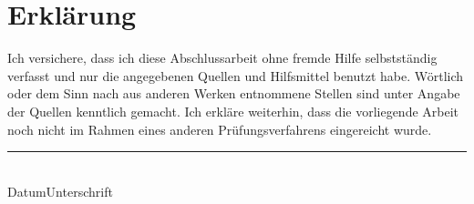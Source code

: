 \chapter*{Erklärung}
Ich  versichere, dass  ich diese  Abschlussarbeit ohne  fremde  Hilfe selbstständig
verfasst und  nur die  angegebenen Quellen und  Hilfsmittel benutzt  habe. Wörtlich
oder dem  Sinn nach  aus anderen  Werken entnommene Stellen  sind unter  Angabe der
Quellen kenntlich gemacht.
Ich erkläre weiterhin, dass die vorliegende Arbeit noch nicht im Rahmen eines anderen Prüfungsverfahrens eingereicht wurde.
\vspace{10ex} \\
\hrule
\\
{\small{Datum}}\hfill{\small{Unterschrift}}